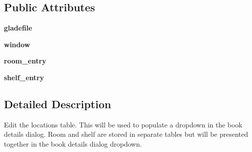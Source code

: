 \subsection*{Public Attributes}
\begin{DoxyCompactItemize}
\item 
\hypertarget{classsrc_1_1location__editor_1_1location__edit_a3bf4ce1347fba300beec18d12869f122}{
{\bfseries gladefile}}
\label{classsrc_1_1location__editor_1_1location__edit_a3bf4ce1347fba300beec18d12869f122}

\item 
\hypertarget{classsrc_1_1location__editor_1_1location__edit_a8a3f33dcf511110053aee255c5e07069}{
{\bfseries window}}
\label{classsrc_1_1location__editor_1_1location__edit_a8a3f33dcf511110053aee255c5e07069}

\item 
\hypertarget{classsrc_1_1location__editor_1_1location__edit_a2c105c79b30e1eb10000f018dc8d9be6}{
{\bfseries room\_\-entry}}
\label{classsrc_1_1location__editor_1_1location__edit_a2c105c79b30e1eb10000f018dc8d9be6}

\item 
\hypertarget{classsrc_1_1location__editor_1_1location__edit_a0af06a55023f6bffd0d16e66ae6198f7}{
{\bfseries shelf\_\-entry}}
\label{classsrc_1_1location__editor_1_1location__edit_a0af06a55023f6bffd0d16e66ae6198f7}

\end{DoxyCompactItemize}


\subsection{Detailed Description}
\begin{DoxyVerb}
Edit the locations table.  This will be used to populate a dropdown
in the book details dialog.  Room and shelf are stored in separate 
tables but will be presented together in the book details dialog dropdown.
\end{DoxyVerb}
 


